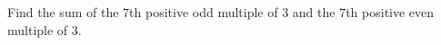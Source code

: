 Find the sum of the $7$th positive odd multiple of $3$ and the $7$th positive even multiple of $3$.
